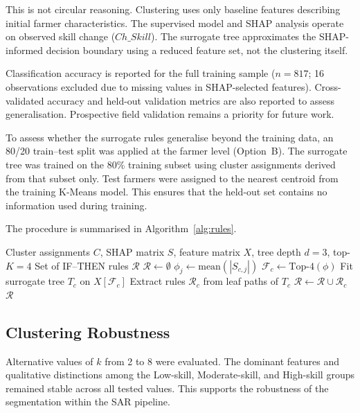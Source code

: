 \documentclass[3p,twocolumn,authoryear]{elsarticle}
\begin{document}
This is not circular reasoning.
Clustering uses only baseline features describing initial farmer
characteristics.
The supervised model and SHAP analysis operate on observed skill change
($Ch\_Skill$).
The surrogate tree approximates the SHAP-informed decision boundary using
a reduced feature set, not the clustering itself.

Classification accuracy is reported for the full training sample
($n = 817$; 16 observations excluded due to missing values in
SHAP-selected features).
Cross-validated accuracy and held-out validation metrics are also reported
to assess generalisation.
Prospective field validation remains a priority for future work.

To assess whether the surrogate rules generalise beyond the training data,
an 80/20 train--test split was applied at the farmer level (Option~B).
The surrogate tree was trained on the 80\% training subset using cluster
assignments derived from that subset only.
Test farmers were assigned to the nearest centroid from the training
K-Means model.
This ensures that the held-out set contains no information used during
training.

The procedure is summarised in Algorithm~\ref{alg:rules}.

\begin{algorithm}
\caption{SHAP-guided Surrogate Rule Extraction}
\label{alg:rules}
\begin{algorithmic}[1]
\Require Cluster assignments $C$, SHAP matrix $S$, feature matrix $X$,
         tree depth $d = 3$, top-$K = 4$
\Ensure Set of IF--THEN rules $\mathcal{R}$
\State $\mathcal{R} \gets \emptyset$
  \State $\phi_j \gets \text{mean}(|S_{c,j}|)$
  \State $\mathcal{F}_c \gets \text{Top-}4(\phi)$
  \State Fit surrogate tree $T_c$ on $X[\mathcal{F}_c]$
  \State Extract rules $\mathcal{R}_c$ from leaf paths of $T_c$
  \State $\mathcal{R} \gets \mathcal{R} \cup \mathcal{R}_c$
\EndFor
\State \Return $\mathcal{R}$
\end{algorithmic}
\end{algorithm}

\subsection{Clustering Robustness}

Alternative values of $k$ from 2 to 8 were evaluated.
The dominant features and qualitative distinctions among the Low-skill,
Moderate-skill, and High-skill groups remained stable across all tested
values.
This supports the robustness of the segmentation within the SAR pipeline.
\end{document}
